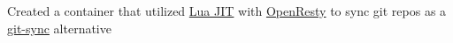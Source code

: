 {Created a container that utilized \href{https://luajit.org/}{Lua JIT} with \href{https://openresty.org/en/}{OpenResty} to sync git repos as a \href{https://github.com/kubernetes/git-sync}{git-sync} alternative}

